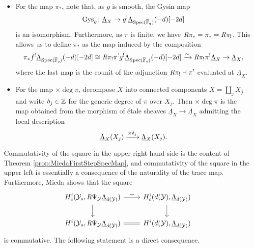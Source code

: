 \documentclass[../main.tex]{subfiles}
\begin{document}
\begin{itemize}
  \item For the map $\pi_*$, note that, as $g$ is smooth, the Gysin map 
    \begin{equation*}
    \mathrm{Gys}_g \colon \underline \Lambda_{X} \to g^! \underline
    \Lambda_{\operatorname{Spec}({\overline {\mathbb{F}}_q})}(-d)[-2d] 
    \end{equation*}
    is an isomorphism. 
    Furthermore, as $\pi$ is finite, we have $\mathit R \pi_* = \pi_* =
    \mathit R \pi_!$. This allows us to define $\pi_*$ as the map induced by the
    composition
    \begin{equation*}
      \pi_* f^! \underline \Lambda_{\operatorname{Spec}({\overline {\mathbb{F}}_q})}(-d)[-2d]
      \cong \mathit R\pi_! \pi^! g^! \underline \Lambda_{\operatorname{Spec}({\overline {\mathbb{F}}_q})}(-d)[-2d] 
      \xrightarrow{\sim} \mathit R \pi_! \pi^! \underline \Lambda_{X}
      \to \underline \Lambda_{X},
    \end{equation*}
    where the last map is the counit of the adjunction $\mathit R \pi_! \dashv \pi^!$
    evaluated at $\underline \Lambda_{X}$.
  \item For the map $\times \deg \pi$, decompose $X$ into connected components
    $X = \coprod_j X_j$ and write $\delta_j \in \mathbb{Z}$ for the generic degree of 
    $\pi$ over $X_j$. Then $\times \deg\pi$ is the map obtained from the morphism
    of \'etale sheaves $\underline \Lambda_X \to \underline \Lambda_X$ admitting
    the local description
    \begin{equation*}
      \underline \Lambda_{X}(X_j) \xrightarrow{\times \delta_j} \underline \Lambda_{X}(X_j).
    \end{equation*}
\end{itemize}
Commutativity of the square in the upper right hand side is the content of
Theorem \ref{prop:MiedaFirstStepSpecMap}, and commutativity of the square in the
upper left is essentially a consequence of the naturality of the trace map.
Furthermore, Mieda shows that the square
\begin{equation*}
\begin{tikzcd}[ampersand replacement=\&]
	{\hH_c^i(\cY_s, \derR \Psi_\cY \underline \Lambda_{d(\cY)})} \& 
  {\hH_c^i(d(\cY), \underline \Lambda_{d(\cY)})} \\
	{\hH^i(\cY_s, \derR \Psi_\cY \underline \Lambda_{d(\cY)})} \& 
  {\hH^i(d(\cY), \underline \Lambda_{d(\cY)})} 
	\arrow["\sim", from=1-1, to=1-2]
	\arrow[from=1-1, to=2-1]
	\arrow[from=1-2, to=2-2]
	\arrow[Rightarrow, no head, from=2-1, to=2-2]
\end{tikzcd}
\end{equation*}
is commutative. The following statement is a direct consequence.
\end{document}
